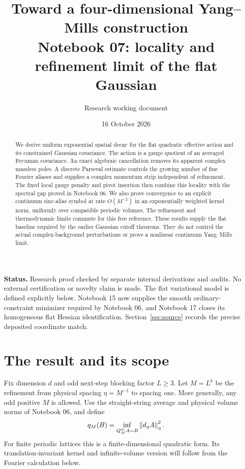\documentclass[11pt]{article}
\title{Toward a four-dimensional Yang--Mills construction\\
\large Notebook 07: locality and refinement limit of the flat Gaussian}
\author{Research working document}
\date{16 October 2026}
\theoremstyle{remark}
\newcommand{\norm}[1]{\left\|#1\right\|}
\begin{document}
\maketitle

\begin{abstract}
We derive uniform exponential spatial decay for the flat quadratic
effective action and its constrained Gaussian covariance. The action
is a gauge quotient of an averaged Feynman covariance. An exact
algebraic cancellation removes its apparent complex massless poles.
A discrete Parseval estimate controls the growing number of fine
Fourier aliases and supplies a complex momentum strip independent of
refinement. The fixed local gauge penalty and pivot insertion then
combine this locality with the spectral gap proved in Notebook 06.
We also prove convergence to an explicit continuum sinc-alias symbol
at rate $O(M^{-2})$ in an exponentially weighted kernel norm, uniformly
over compatible periodic volumes. The refinement and thermodynamic
limits commute for this free reference. These results supply the flat
baseline required by the earlier Gaussian cutoff theorems. They do not
control the actual complex-background perturbations or prove a nonlinear
continuum Yang--Mills limit.
\end{abstract}

\noindent\textbf{Status.}
Research proof checked by separate internal derivations and audits.
No external certification or novelty claim is made.
The flat variational model is defined explicitly
below. Notebook 15 now supplies the smooth ordinary-constraint
minimizer required by Notebook 06, and Notebook 17 closes its
homogeneous flat Hessian identification. Section~\ref{sec:source}
records the precise deposited coordinate match.

\section{The result and its scope}

Fix dimension $d$ and odd next-step blocking factor $L\ge3$.
Let $M=L^k$ be the refinement from physical spacing $\eta=M^{-1}$
to spacing one. More generally, any odd positive $M$ is allowed.
Use the straight-string average and physical volume norms of Notebook 06,
and define
\[
 q_M(B)=\inf_{Q_M^{\rm st}A=B}\norm{d_\eta A}_\eta^2.
\]
For finite periodic lattices this is a finite-dimensional quadratic
form. Its translation-invariant kernel and infinite-volume version
will follow from the Fourier calculation below.
\end{document}
